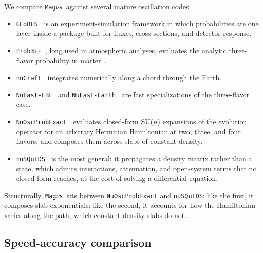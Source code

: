 \documentclass[final,5p,times,twocolumn,sort,compress]{elsarticle}
\makeatletter
\DeclareRobustCommand{\_}{%
  \ifmmode\nfss@text{\textunderscore}\else\textunderscore\allowbreak\fi}
\newcommand{\magnus}{{\tt Mag}\ensuremath{\nu}{\tt s}}
\makeatother
\begin{document}
We compare \magnus\ against several mature oscillation codes:
\begin{itemize}
\item {\tt GLoBES}\ \cite{GLoBES, Huber:2007ji} is an experiment-simulation framework in which probabilities are one layer inside a package built for fluxes, cross sections, and detector response.
\item {\tt Prob3++}\ \cite{Prob3pp}, long used in atmospheric analyses, evaluates the analytic three-flavor probability in matter\ \cite{Barger:1980tf}.
\item {\tt nuCraft}\ \cite{nuCraft} integrates numerically along a chord through the Earth.
\item {\tt NuFast-LBL}\ \cite{Denton:2024pzc} and {\tt NuFast-Earth}\ \cite{Denton:2025oxf} are fast specializations of the three-flavor case.
\item {\tt NuOscProbExact}\ \cite{NuOscProbExact, Bustamante:2019ggq} evaluates closed-form SU($n$) expansions of the evolution operator for an arbitrary Hermitian Hamiltonian at two, three, and four flavors, and composes them across slabs of constant density.
\item {\tt nuSQuIDS}\ \cite{Delgado:2014kpa, Arguelles:2021twb, NuSQuIDS} is the most general: it propagates a density matrix rather than a state, which admits interactions, attenuation, and open-system terms that no closed form reaches, at the cost of solving a differential equation.
\end{itemize}
Structurally, \magnus\ sits between {\tt NuOscProbExact} and {\tt nuSQuIDS}: like the first, it composes slab exponentials; like the second, it accounts for how the Hamiltonian varies along the path, which constant-density slabs do not.


\subsection{Speed-accuracy comparison}
\label{sec:prem_planes}
\end{document}
